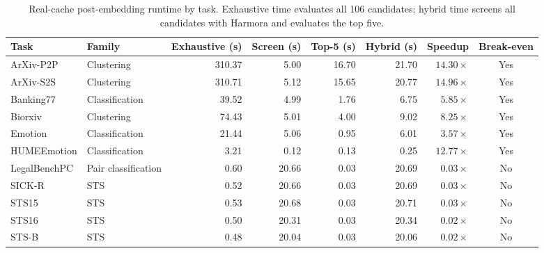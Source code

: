 \begin{table}[t]
\centering
\caption{Real-cache post-embedding runtime by task. Exhaustive time evaluates all 106 candidates; hybrid time screens all candidates with Harmora and evaluates the top five.}
\label{tab:runtime_real_tasks}
\footnotesize
\setlength{\tabcolsep}{4pt}
\renewcommand{\arraystretch}{1.07}
\begin{tabular*}{\textwidth}{@{\extracolsep{\fill}}llrrrrrc@{}}
\toprule
\textbf{Task} & \textbf{Family} & \textbf{Exhaustive (s)} & \textbf{Screen (s)} & \textbf{Top-5 (s)} & \textbf{Hybrid (s)} & \textbf{Speedup} & \textbf{Break-even} \\
\midrule
ArXiv-P2P & Clustering & 310.37 & 5.00 & 16.70 & 21.70 & $14.30\times$ & Yes \\
ArXiv-S2S & Clustering & 310.71 & 5.12 & 15.65 & 20.77 & $14.96\times$ & Yes \\
Banking77 & Classification & 39.52 & 4.99 & 1.76 & 6.75 & $5.85\times$ & Yes \\
Biorxiv & Clustering & 74.43 & 5.01 & 4.00 & 9.02 & $8.25\times$ & Yes \\
Emotion & Classification & 21.44 & 5.06 & 0.95 & 6.01 & $3.57\times$ & Yes \\
HUMEEmotion & Classification & 3.21 & 0.12 & 0.13 & 0.25 & $12.77\times$ & Yes \\
LegalBenchPC & Pair classification & 0.60 & 20.66 & 0.03 & 20.69 & $0.03\times$ & No \\
SICK-R & STS & 0.52 & 20.66 & 0.03 & 20.69 & $0.03\times$ & No \\
STS15 & STS & 0.53 & 20.68 & 0.03 & 20.71 & $0.03\times$ & No \\
STS16 & STS & 0.50 & 20.31 & 0.03 & 20.34 & $0.02\times$ & No \\
STS-B & STS & 0.48 & 20.04 & 0.03 & 20.06 & $0.02\times$ & No \\
\bottomrule
\end{tabular*}
\end{table}
